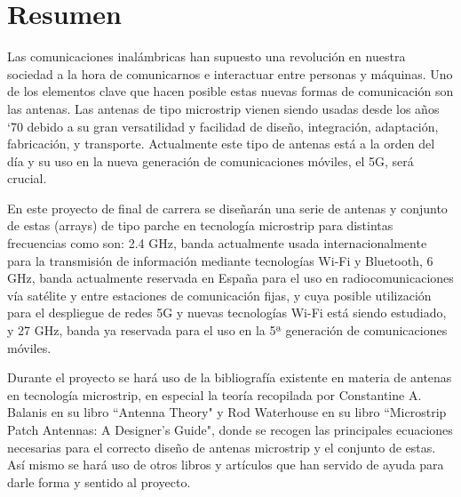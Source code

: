 \thispagestyle{empty}
\vspace*{-20cm}
\chapter*{Resumen}

\par Las comunicaciones inalámbricas han supuesto una revolución en nuestra sociedad a la hora de comunicarnos e interactuar entre personas y máquinas. Uno de los elementos clave que hacen posible estas nuevas formas de comunicación son las antenas. Las antenas de tipo microstrip vienen siendo usadas desde los años ‘70 debido a su gran versatilidad y facilidad de diseño, integración, adaptación, fabricación, y transporte. Actualmente este tipo de antenas está a la orden del día y su uso en la nueva generación de comunicaciones móviles, el 5G, será crucial.
\\
\par En este proyecto de final de carrera se diseñarán una serie de antenas y conjunto de estas (arrays) de tipo parche en tecnología microstrip para distintas frecuencias como son: 2.4 GHz, banda actualmente usada internacionalmente para la transmisión de información mediante tecnologías Wi-Fi y Bluetooth, 6 GHz, banda actualmente reservada en España para el uso en radiocomunicaciones vía satélite y entre estaciones de comunicación fijas, y cuya posible utilización para el despliegue de redes 5G y nuevas tecnologías Wi-Fi está siendo estudiado, y 27 GHz, banda ya reservada para el uso en la 5ª generación de comunicaciones móviles.
\\
\par Durante el proyecto se hará uso de la bibliografía existente en materia de antenas en tecnología microstrip, en especial la teoría recopilada por Constantine A. Balanis en su libro ``Antenna Theory" y Rod Waterhouse en su libro ``Microstrip Patch Antennas: A Designer's Guide", donde se recogen las principales ecuaciones necesarias para el correcto diseño de antenas microstrip y el conjunto de estas. Así mismo se hará uso de otros libros y artículos que han servido de ayuda para darle forma y sentido al proyecto.
\\
